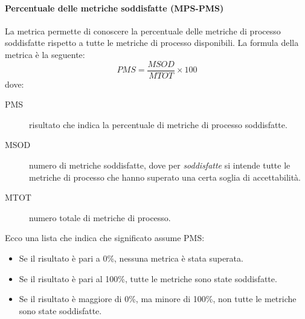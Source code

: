 \documentclass[../../norme-di-progetto.tex]{subfiles}
\begin{document}
\paragraph{Percentuale delle metriche soddisfatte (MPS-PMS)}%
\label{par:percentuale_delle_metriche_soddisfatte}

La metrica permette di conoscere la percentuale delle metriche di processo soddisfatte rispetto a tutte le metriche di processo disponibili.
La formula della metrica è la seguente:
\[
  PMS = \frac{MSOD}{MTOT} \times 100
\]
dove:
\begin{description}
  \item[PMS] risultato che indica la percentuale di metriche di processo soddisfatte.
  \item[MSOD] numero di metriche soddisfatte, dove per \textit{soddisfatte} si intende tutte le metriche di processo che hanno superato una certa soglia di accettabilità.
  \item[MTOT] numero totale di metriche di processo.
\end{description}

Ecco una lista che indica che significato assume PMS\@:
\begin{itemize}
  \item Se il risultato è pari a 0\%, nessuna metrica è stata superata.
  \item Se il risultato è pari al 100\%, tutte le metriche sono state soddisfatte.
  \item Se il risultato è maggiore di 0\%, ma minore di 100\%, non tutte le metriche sono state soddisfatte.
\end{itemize}


\end{document}
